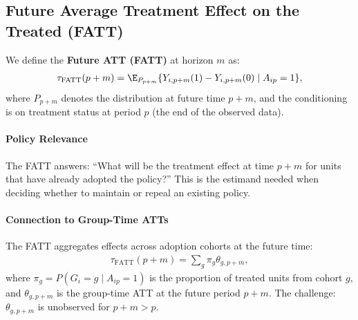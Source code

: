 \documentclass{article}
\begin{document}
\subsection{Future Average Treatment Effect on the Treated (FATT)}


We define the \textbf{Future ATT (FATT)} at horizon $m$ as:
\begin{align}
\tau_{\text{FATT}}(p+m) = \E_{P_{p+m}}\{Y_{i,p+m}(1) - Y_{i,p+m}(0) \mid A_{ip} = 1\},
\label{eq:fatt}
\end{align}
where $P_{p+m}$ denotes the distribution at future time $p+m$, and the conditioning is on treatment status at period $p$ (the end of the observed data).

\paragraph{Policy Relevance}


The FATT answers: ``What will be the treatment effect at time $p+m$ for units that have already adopted the policy?'' This is the estimand needed when deciding whether to maintain or repeal an existing policy.

\paragraph{Connection to Group-Time ATTs}


The FATT aggregates effects across adoption cohorts at the future time:
\begin{align}
\tau_{\text{FATT}}(p+m) = \sum_g \pi_g \theta_{g,p+m},
\label{eq:fatt-decomposition}
\end{align}
where $\pi_g = P(G_i = g \mid A_{ip} = 1)$ is the proportion of treated units from cohort $g$, and $\theta_{g,p+m}$ is the group-time ATT at the future period $p+m$. The challenge: $\theta_{g,p+m}$ is unobserved for $p+m > p$.
\end{document}
